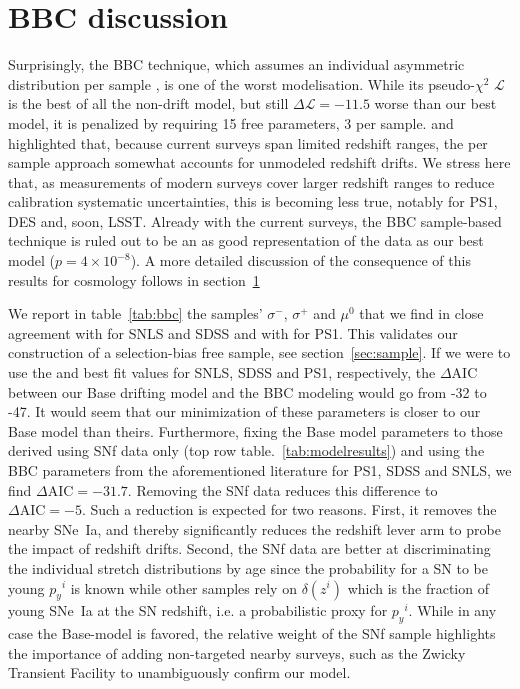\documentclass[]{aa} %
\newcommand{\mr}[1]{{\textcolor[rgb]{0.60,0.10,0.6}{#1}}}
\newcommand{\nn}[1]{{\textcolor[rgb]{1, 0.27, 0}{#1}}}
\begin{document}
\section{\nn{BBC discussion}}
\label{sec:bbc}
\mr{Surprisingly, the BBC technique, which assumes an individual asymmetric
    distribution per sample \citep{scolnic2016,kessler2017}, is one of the worst
    modelisation. While its pseudo-$\chi^{2}$ $\mathcal{L}$ is the best of all
    the non-drift model, but still $\Delta \mathcal{L}=-11.5$ worse than our
    best model, it is penalized by requiring 15 free parameters, 3 per sample.
    \citet[][section~2]{scolnic2016} and \citet[][section~5.4]{scolnic2018a}
    highlighted that, because current surveys span limited redshift ranges, the
    per sample approach somewhat accounts for unmodeled redshift drifts. We
    stress here that, as measurements of modern surveys cover larger redshift
    ranges to reduce calibration systematic  uncertainties, this is becoming
    less true, notably for PS1, DES and, soon, LSST. Already with the current
    surveys, the BBC sample-based technique is \nn{ruled out} to be an as good
    representation of the data as our best model ($p=4\times 10^{-8}$). A more
    detailed discussion of the consequence of this results for cosmology follows
in section~\ref{sec:bbc}}

\mr{We report in table~\ref{tab:bbc} the samples' $\sigma^-$, $\sigma^+$ and
    $\mu^0$ that we find in close agreement with \cite{scolnic2016} for SNLS and
    SDSS and with \cite{scolnic2018a} for PS1. This validates \nn{our} construction
    of \nn{a} selection-bias free sample, see
    section~\ref{sec:sample}. If we were to use the \cite{scolnic2016} and
    \cite{scolnic2018a} best fit values for SNLS, SDSS and PS1, respectively,
    the $\Delta\mathrm{AIC}$ between our Base drifting model and the BBC
    modeling would go from -32 to -47. \nn{It would seem that our minimization
    of these parameters is closer to our Base model than theirs}. Furthermore,
    fixing the Base model parameters to those derived using SNf data only (top
    row table.~\ref{tab:modelresults}) and using the BBC parameters from the
    aforementioned literature for PS1, SDSS and SNLS, we find
    $\Delta\mathrm{AIC}=-31.7$. Removing the SNf data reduces this difference to
    $\Delta\mathrm{AIC}=-5$. Such a reduction is expected for two reasons.
    First, it removes the nearby SNe~Ia, and thereby significantly reduces the
    redshift \nn{lever} arm to probe the impact of redshift drifts.
    Second, the SNf data are better at discriminating the individual stretch
    distributions by age since the probability for a SN to be young $p_y{}^i$ is
    known while other samples rely on $\delta(z^i)$ which is the fraction
    of young SNe~Ia at the SN redshift, i.e. a probabilistic proxy for
    $p_y{}^i$. While in any case the Base-model is favored, the relative weight
    of the SNf sample highlights the importance of adding non-targeted nearby
surveys, such as the Zwicky Transient Facility \cite[ZTF,][]{bellm2019,
graham2019} to unambiguously confirm our \nn{model}.}
\end{document}
